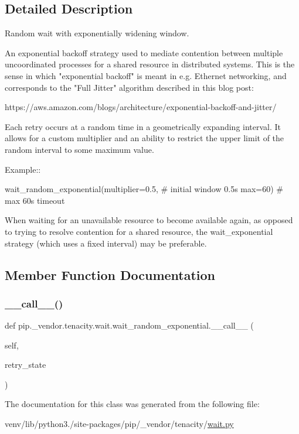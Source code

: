\subsection{Detailed Description}
\begin{DoxyVerb}Random wait with exponentially widening window.

An exponential backoff strategy used to mediate contention between multiple
uncoordinated processes for a shared resource in distributed systems. This
is the sense in which "exponential backoff" is meant in e.g. Ethernet
networking, and corresponds to the "Full Jitter" algorithm described in
this blog post:

https://aws.amazon.com/blogs/architecture/exponential-backoff-and-jitter/

Each retry occurs at a random time in a geometrically expanding interval.
It allows for a custom multiplier and an ability to restrict the upper
limit of the random interval to some maximum value.

Example::

    wait_random_exponential(multiplier=0.5,  # initial window 0.5s
                            max=60)          # max 60s timeout

When waiting for an unavailable resource to become available again, as
opposed to trying to resolve contention for a shared resource, the
wait_exponential strategy (which uses a fixed interval) may be preferable.\end{DoxyVerb}
 

\subsection{Member Function Documentation}
\mbox{\label{classpip_1_1__vendor_1_1tenacity_1_1wait_1_1wait__random__exponential_ac6a0ed8050e3b4a9617fdbb742641275}} 
\subsubsection{\texorpdfstring{\+\_\+\+\_\+call\+\_\+\+\_\+()}{\_\_call\_\_()}}
{\footnotesize\ttfamily def pip.\+\_\+vendor.\+tenacity.\+wait.\+wait\+\_\+random\+\_\+exponential.\+\_\+\+\_\+call\+\_\+\+\_\+ (\begin{DoxyParamCaption}\item[{}]{self,  }\item[{}]{retry\+\_\+state }\end{DoxyParamCaption})}



The documentation for this class was generated from the following file\+:\begin{DoxyCompactItemize}
\item 
venv/lib/python3./site-\/packages/pip/\+\_\+vendor/tenacity/\hyperlink{tenacity_2wait_8py}{wait.\+py}\end{DoxyCompactItemize}
